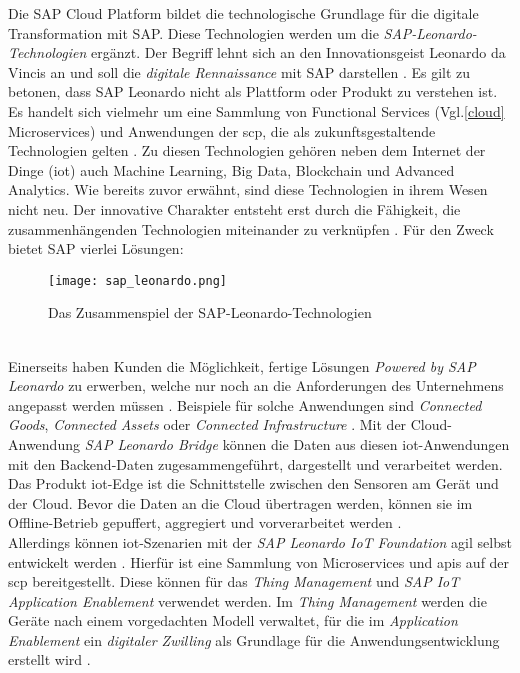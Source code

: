 Die SAP Cloud Platform bildet die technologische Grundlage für die digitale Transformation mit SAP. Diese Technologien werden um die \textit{SAP-Leonardo-Technologien} ergänzt. Der Begriff lehnt sich an den Innovationsgeist Leonardo da Vincis an und soll die \textit{digitale Rennaissance} mit SAP  darstellen \citep{Howells2017}. Es gilt zu betonen, dass SAP Leonardo nicht als Plattform oder Produkt zu verstehen ist. Es handelt sich vielmehr um eine Sammlung von Functional Services (Vgl.\ref{cloud} Microservices) und Anwendungen der \ac{scp}, die als zukunftsgestaltende Technologien gelten \citep{Elsner2018}. Zu diesen Technologien gehören neben dem Internet der Dinge (\acf{iot}) auch Machine Learning, Big Data, Blockchain und Advanced Analytics. Wie bereits zuvor erwähnt, sind diese Technologien in ihrem Wesen nicht neu. Der innovative Charakter entsteht erst durch die Fähigkeit, die zusammenhängenden Technologien miteinander zu verknüpfen \citep{Utecht2018}. Für den Zweck bietet SAP vierlei Lösungen:
\begin{figure}[ht]
  \centering
  \texttt{[image: sap\_leonardo.png]}
  \caption{Das Zusammenspiel der SAP-Leonardo-Technologien \citep[S. 87]{Elsner2018}}
\end{figure}
 \\Einerseits haben Kunden die Möglichkeit, fertige Lösungen \textit{Powered by SAP Leonardo} zu erwerben, welche nur noch an die Anforderungen des Unternehmens angepasst werden müssen \citep{Utecht2018}. Beispiele für solche Anwendungen sind \textit{Connected Goods}, \textit{Connected Assets} oder \textit{Connected Infrastructure} \citep{Elsner2018}. Mit der Cloud-Anwendung \textit{SAP Leonardo Bridge} können die Daten aus diesen \ac{iot}-Anwendungen mit den Backend-Daten zugesammengeführt, dargestellt und verarbeitet werden. Das Produkt \ac{iot}-Edge ist die Schnittstelle zwischen den Sensoren am Gerät und der Cloud. Bevor die Daten an die Cloud übertragen werden, können sie im Offline-Betrieb gepuffert, aggregiert und vorverarbeitet werden \citep{Utecht2018}.
\\Allerdings können \ac{iot}-Szenarien mit der \textit{SAP Leonardo IoT Foundation} agil selbst entwickelt werden \citep{Elsner2018}. Hierfür ist eine Sammlung von Microservices und \ac{api}s auf der \ac{scp} bereitgestellt. Diese können für das \textit{Thing Management} und \textit{SAP IoT Application Enablement} verwendet werden. Im \textit{Thing Management} werden die Geräte nach einem vorgedachten Modell verwaltet, für die im \textit{Application Enablement} ein \textit{digitaler Zwilling} als Grundlage für die Anwendungsentwicklung erstellt wird \citep{Elsner2018}.
